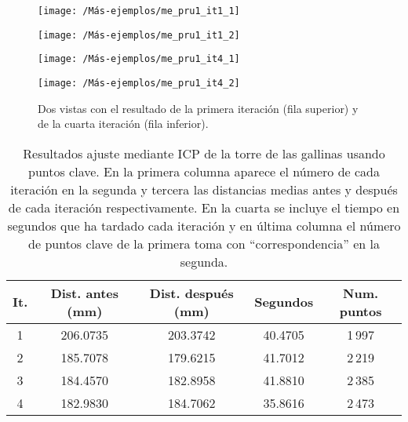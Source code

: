 \begin{figure}[h!]	
	\begin{minipage}[b]{0.5\textwidth}
		\centering		
		\texttt{[image: /Más-ejemplos/me\_pru1\_it1\_1]} 
	\end{minipage}
	\begin{minipage}[b]{0.5\textwidth}
		\centering
		\texttt{[image: /Más-ejemplos/me\_pru1\_it1\_2]}
	\end{minipage}
	\begin{minipage}[b]{0.5\textwidth}
		\centering		
		\texttt{[image: /Más-ejemplos/me\_pru1\_it4\_1]} 
	\end{minipage}
	\begin{minipage}[b]{0.5\textwidth}
		\centering
		\texttt{[image: /Más-ejemplos/me\_pru1\_it4\_2]}
	\end{minipage}
	\caption{Dos vistas con el resultado de la primera iteración (fila superior) y de la cuarta iteración (fila inferior).}
	\label{fig:ICPtorre}
\end{figure}

\begin{comment}
EN los segundos me salía entorno a 17!!!! con cota unos 0.003
\end{comment}

\begin{table}[h!]
	\centering
	\begin{tabular}{| c | c | c | c | c |} 
		\hline
		It. & Dist. antes (mm) & Dist. después (mm) & Segundos & Num. puntos \\
		\hline
		1 &  206.0735 & 203.3742 & 40.4705 & 1\,997 \\				  
		2 & 185.7078 & 179.6215 & 41.7012 & 2\,219  \\	
		3 & 184.4570 & 182.8958  & 41.8810 &  2\,385 \\
		4 & 182.9830 &  184.7062 & 35.8616 & 2\,473\\
		\hline
	\end{tabular}
	\caption{Resultados ajuste mediante ICP de la torre de las gallinas usando puntos clave. En la primera columna aparece el número de cada iteración en la segunda y tercera las distancias medias antes y después de cada iteración respectivamente. En la cuarta se incluye el tiempo en segundos que ha tardado cada iteración y en última columna el número de puntos clave de la primera toma con ``correspondencia'' en la segunda.}
\end{table}


